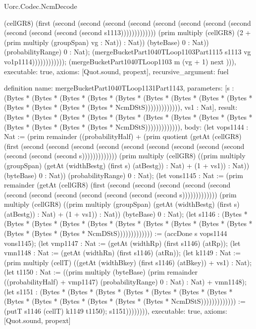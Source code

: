 \begin{lexlean}{Uorc.Codec.NcmDecode}
\begin{semanticmodule}
{(cellGR8) (first (second (second (second (second (second (second (second (second (second (second (second (second s1113))))))))))))) (prim multiply (cellGR8) (2 + (prim multiply (groupSpan) vg : Nat)) : Nat)) (byteBase) 0 : Nat)) (probabilityRange) 0 : Nat); (mergeBucketPart1040TLoop1103Part1115 s1113 vg vo1p1114)))))))))))); (mergeBucketPart1040TLoop1103 m (vg + 1) next ))),
  executable: true,
  axioms: [Quot.sound, propext],
  recursive_argument: fuel
}

definition{
  name: mergeBucketPart1040TLoop1131Part1143,
  parameters: [s : (Bytes * (Bytes * (Bytes * (Bytes * (Bytes * (Bytes * (Bytes * (Bytes * (Bytes * (Bytes * (Bytes * (Bytes * (Bytes * NcmDStS))))))))))))), vs1 : Nat],
  result: (Bytes * (Bytes * (Bytes * (Bytes * (Bytes * (Bytes * (Bytes * (Bytes * (Bytes * (Bytes * (Bytes * (Bytes * (Bytes * NcmDStS))))))))))))),
  body: (let vops1144 : Nat := (prim remainder ((probabilityHalf) + (prim quotient (getAt (cellGR8) (first (second (second (second (second (second (second (second (second (second (second (second (second s))))))))))))) (prim multiply (cellGR8) ((prim multiply (groupSpan) (getAt (widthBestg) (first s) (atBestg)) : Nat) + (1 + vs1)) : Nat)) (byteBase) 0 : Nat)) (probabilityRange) 0 : Nat); (let vons1145 : Nat := (prim remainder (getAt (cellGR8) (first (second (second (second (second (second (second (second (second (second (second (second (second s))))))))))))) (prim multiply (cellGR8) ((prim multiply (groupSpan) (getAt (widthBestg) (first s) (atBestg)) : Nat) + (1 + vs1)) : Nat)) (byteBase) 0 : Nat); (let s1146 : (Bytes * (Bytes * (Bytes * (Bytes * (Bytes * (Bytes * (Bytes * (Bytes * (Bytes * (Bytes * (Bytes * (Bytes * (Bytes * NcmDStS))))))))))))) := (accDone s vops1144 vons1145); (let vmp1147 : Nat := (getAt (widthRp) (first s1146) (atRp)); (let vmn1148 : Nat := (getAt (widthRn) (first s1146) (atRn)); (let k1149 : Nat := (prim multiply (cellT) ((getAt (widthBkey) (first s1146) (atBkey)) + vs1) : Nat); (let t1150 : Nat := ((prim multiply (byteBase) (prim remainder ((probabilityHalf) + vmp1147) (probabilityRange) 0 : Nat) : Nat) + vmn1148); (let s1151 : (Bytes * (Bytes * (Bytes * (Bytes * (Bytes * (Bytes * (Bytes * (Bytes * (Bytes * (Bytes * (Bytes * (Bytes * (Bytes * NcmDStS))))))))))))) := (putT s1146 (cellT) k1149 t1150); s1151)))))))),
  executable: true,
  axioms: [Quot.sound, propext]
}


\end{semanticmodule}
\end{lexlean}

